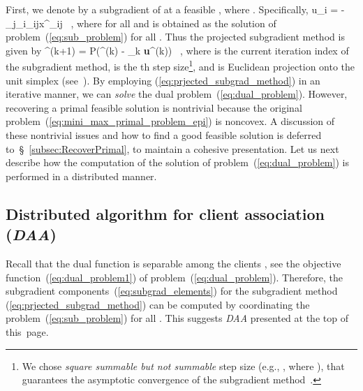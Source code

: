 \documentclass[journal, 10pt, twocolumn]{IEEEtran}
\newcommand{\be}{}
\renewcommand{\vec}[1]{\bf{#1}}     \newcommand{\vecsc}[1]{\mbox {\boldmath \scriptsize }}     \newcommand{\itvec}[1]{\mbox {\boldmath }}
\begin{document}
First, we denote by  a subgradient of  at a feasible , where .
Specifically,
\be\label{eq:subgrad_elements}
\textstyle u_i = -\sum_{j\in{}_i}\beta_{ij}x^\star_{ij} \ ,
\ee
where  for all  and  is obtained as the solution of problem~(\ref{eq:sub_problem}) for all . Thus the projected subgradient method is given by
\be\label{eq:prjected_subgrad_method}
\boldsymbol{\lambda}^{(k+1)} =  P\big(\boldsymbol{\lambda}^{(k)} - \alpha_k {\vec u}^{(k)}\big) \ ,
\ee
where  is the current iteration index of the subgradient method,  is the th step size\footnote{We chose \emph{square summable but not summable} step size (e.g., , where ), that guarantees the asymptotic convergence of the subgradient method~\cite{Boyd-EE364b-SubGradMethods-07}.}, and  is Euclidean projection onto the unit simplex  (see~\cite[Excercise~2.1.12]{Bertsekas-99}). By employing (\ref{eq:prjected_subgrad_method}) in an iterative manner, we can \emph{solve} the dual problem~(\ref{eq:dual_problem}). However, recovering a primal feasible solution is nontrivial because the original problem~(\ref{eq:mini_max_primal_problem_epi}) is noncovex. A discussion of these nontrivial issues and how to find a good feasible solution is deferred to~\S~\ref{subsec:RecoverPrimal}, to maintain a cohesive presentation. Let us next describe how the computation of the solution of problem~(\ref{eq:dual_problem}) is performed in a distributed manner.




\subsection{Distributed algorithm for client association (\emph{DAA})}\label{subsec:distributed_alg}
Recall that the dual function  is separable among the clients , see the objective function~(\ref{eq:dual_problem1}) of problem~(\ref{eq:dual_problem}). Therefore, the subgradient components~(\ref{eq:subgrad_elements}) for the subgradient method (\ref{eq:prjected_subgrad_method}) can be computed by coordinating the problem~(\ref{eq:sub_problem}) for all . This suggests \emph{DAA} presented at the top of this~page.
\end{document}
